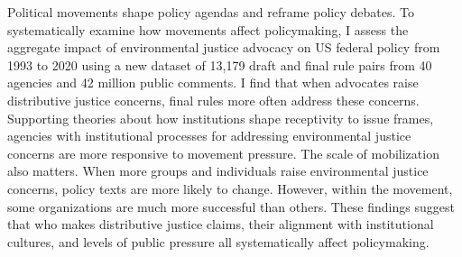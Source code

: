 Political movements shape policy agendas and reframe policy debates.  To systematically examine how movements affect policymaking, I assess the aggregate impact of environmental justice advocacy on US federal policy from 1993 to 2020 using a new dataset of 13,179 draft and final rule pairs from 40 agencies and 42 million public comments. I find that when advocates raise distributive justice concerns, final rules more often address these concerns. Supporting theories about how institutions shape receptivity to issue frames, agencies with institutional processes for addressing environmental justice concerns are more responsive to movement pressure. The scale of mobilization also matters. When more groups and individuals raise environmental justice concerns, policy texts are more likely to change. However, within the movement, some organizations are much more successful than others. These findings suggest that who makes distributive justice claims, their alignment with institutional cultures, and levels of public pressure all systematically affect policymaking.